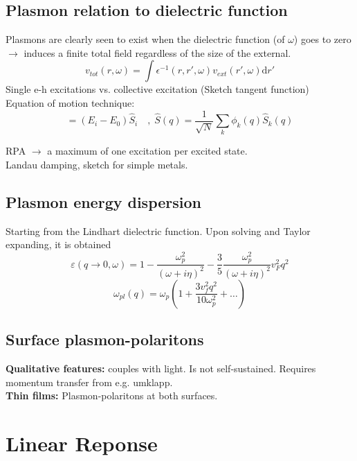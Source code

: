 \documentclass{article}
\begin{document}
\subsection{Plasmon relation to dielectric function}
Plasmons are clearly seen to exist when the dielectric function (of $\omega$) goes to zero $\rightarrow$ induces a finite total field regardless of the size of the external.
\begin{equation}
    v_{tot}(r,\omega) = \int\epsilon^{-1}(r,r',\omega)v_{ext}(r',\omega)\mathrm{d}r'
\end{equation}
Single e-h excitations vs. collective excitation (Sketch tangent function)\\
Equation of motion technique:
\begin{equation}
    [\hat{S}_i,\hat{H}] = (E_i - E_0)\hat{S}_i \quad, \; \hat{S}(q) = \dfrac{1}{\sqrt{N}}\sum_{k}\phi_k(q)\hat{S}_k(q)
\end{equation}

RPA $\rightarrow$ a maximum of one excitation per excited state.\\
Landau damping, sketch for simple metals.
\subsection{Plasmon energy dispersion}
Starting from the Lindhart dielectric function. Upon solving and Taylor expanding, it is obtained
\begin{equation}
    \varepsilon(q \rightarrow 0,\omega) = 1 - \frac{\omega_p^2}{(\omega + i \eta)^2} - \frac{3}{5} \frac{\omega_p^2}{(\omega+i\eta)^2}v_F^2 q^2
\end{equation}
\begin{equation}
    \omega_{pl}(q) = \omega_p\left(1 + \dfrac{3 v_f^2q^2}{10\omega_p^2} + \ldots\right)
\end{equation}

\subsection{Surface plasmon-polaritons}
\textbf{Qualitative features:} couples with light. Is not self-sustained. Requires momentum transfer from e.g. umklapp.\\ \textbf{Thin films:} Plasmon-polaritons at both surfaces.


\newpage
\section{Linear Reponse}
\end{document}
